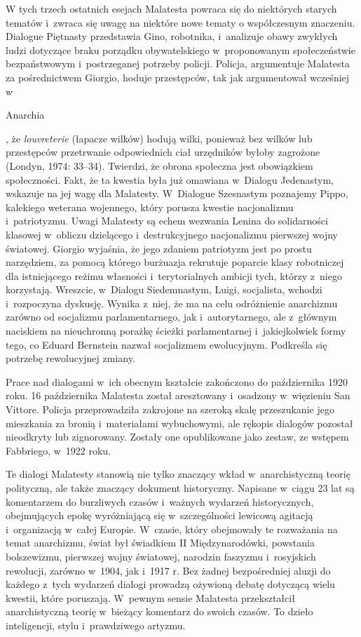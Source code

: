 \documentclass[oneside,polish,11pt,sfheadings]{mwbk}
\begin{document}
 
W tych trzech ostatnich esejach Malatesta powraca się do niektórych starych tematów i~zwraca się uwagę na niektóre nowe
tematy o współczesnym znaczeniu. Dialogue Piętnasty przedstawia Gino, robotnika, i~analizuje obawy zwykłych ludzi
dotyczące braku porządku obywatelskiego w~proponowanym społeczeństwie bezpaństwowym i~postrzeganej potrzeby policji.
Policja, argumentuje Malatesta za pośrednictwem Giorgio, hoduje przestępców, tak jak argumentował wcześniej w~\begin{itshape}Anarchia\end{itshape}, że \textit{louvreterie} (łapacze wilków) hodują
wilki, ponieważ bez wilków lub przestępców przetrwanie odpowiednich ciał urzędników byłoby zagrożone (Londyn, 1974:
33–34). Twierdzi, że obrona społeczna jest obowiązkiem społeczności. Fakt, że ta kwestia była już omawiana w~Dialogu
Jedenastym, wskazuje na jej wagę dla Malatesty. W~Dialogue Szesnastym poznajemy Pippo, kalekiego weterana wojennego,
który porusza kwestie nacjonalizmu i~patriotyzmu. Uwagi Malatesty są echem wezwania Lenina do solidarności klasowej w~obliczu dzielącego i~destrukcyjnego nacjonalizmu pierwszej wojny światowej. Giorgio wyjaśnia, że jego zdaniem
patriotyzm jest po prostu narzędziem, za pomocą którego burżuazja rekrutuje poparcie klasy robotniczej dla istniejącego
reżimu własności i~terytorialnych ambicji tych, którzy z~niego korzystają. Wreszcie, w~Dialogu Siedemnastym, Luigi,
socjalista, wchodzi i~rozpoczyna dyskusję. Wynika z~niej, że ma na celu odróżnienie anarchizmu zarówno od socjalizmu
parlamentarnego, jak i~autorytarnego, ale z~głównym naciskiem na nieuchronną porażkę ścieżki parlamentarnej i~jakiejkolwiek formy tego, co Eduard Bernstein nazwał socjalizmem ewolucyjnym. Podkreśla się potrzebę rewolucyjnej
zmiany. 

 
Prace nad dialogami w~ich obecnym kształcie zakończono do października 1920 roku.  16 października Malatesta został
aresztowany i~osadzony w~więzieniu San Vittore. Policja przeprowadziła zakrojone na szeroką skalę przeszukanie jego
mieszkania za bronią i~materiałami wybuchowymi, ale rękopis dialogów pozostał nieodkryty lub zignorowany. Zostały one
opublikowane jako zestaw, ze wstępem Fabbriego, w~1922 roku. 

 
Te dialogi Malatesty stanowią nie tylko znaczący wkład w~anarchistyczną teorię polityczną, ale także znaczący dokument
historyczny. Napisane w~ciągu 23 lat są komentarzem do burzliwych czasów i~ważnych wydarzeń historycznych, obejmujących
epokę wyróżniającą się w~szczególności lewicową agitacją i~organizacją w~całej Europie. W~czasie, który obejmowały te
rozważania na temat anarchizmu, świat był świadkiem II Międzynarodówki, powstania bolszewizmu, pierwszej wojny
światowej, narodzin faszyzmu i~rosyjskich rewolucji, zarówno w~1904, jak i~1917 r.  Bez żadnej bezpośredniej aluzji do
każdego z~tych wydarzeń dialogi prowadzą ożywioną debatę dotyczącą wielu kwestii, które poruszają. W~pewnym sensie
Malatesta przekształcił anarchistyczną teorię w~bieżący komentarz do swoich czasów. To dzieło inteligencji, stylu i~prawdziwego artyzmu. 
\end{document}
